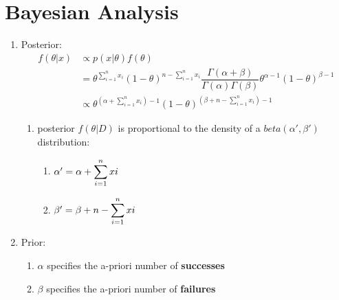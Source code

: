 \section{Bayesian Analysis \cite{ism-1}} \label{Beta Distribution: Bayesian Analysis}

\begin{enumerate}
    \item Posterior: \cite{ism-1}
    \[
    \begin{aligned}
         f(\theta|x) 
         &\propto p(x|\theta) f (\theta) \\
         &= \theta^{\sum^{n}_{i=1} x_i} 
            (1 - \theta)^{n - \sum^{n}_{i=1} x_i}
            \dfrac{\Gamma (\alpha + \beta)}{\Gamma (\alpha)\Gamma (\beta)}
            \theta^{\alpha-1} (1 - \theta)^{\beta-1} \\
        &\propto \theta^{(\alpha + \sum^{n}_{i=1} x_i)-1} 
            (1-\theta)^{(\beta + n - \sum^{n}_{i=1} x_i)-1} 
    \end{aligned}
    \]

    \begin{enumerate}
        \item[] posterior $f (\theta|D)$ is proportional to the density of a $beta(\alpha', \beta')$ distribution:
        \begin{enumerate}
            \item $\alpha' = \alpha + \displaystyle\sum^{n}_{i=1} xi$

            \item $\beta' = \beta + n - \displaystyle\sum^{n}_{i=1} xi$
        
        \end{enumerate}

    \end{enumerate}

    \item Prior:
    \begin{enumerate}
        \item $\alpha$ specifies the a-priori number of \textbf{successes}

        \item $\beta$ specifies the a-priori number of \textbf{failures}

    \end{enumerate}

\end{enumerate}







